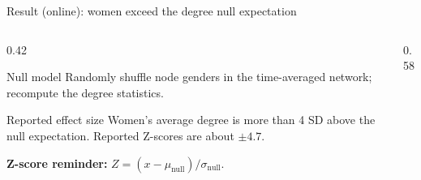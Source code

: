 \begin{frame}{Result (online): women exceed the degree null expectation}
  \small
  \begin{columns}[T,onlytextwidth]
    \begin{column}{0.42\textwidth}
      \begin{block}{Null model}
        Randomly shuffle node genders in the time-averaged network; recompute the degree statistics.
      \end{block}

      \begin{exampleblock}{Reported effect size}
        Women's average degree is more than 4 SD above the null expectation. Reported Z-scores are about $\pm 4.7$.
      \end{exampleblock}

      {\color{PresTwoSecondary}\textbf{Z-score reminder:}}
      $Z=(x-\mu_{\text{null}})/\sigma_{\text{null}}$.
    \end{column}

    \begin{column}{0.58\textwidth}
    \end{column}
  \end{columns}

\end{frame}

